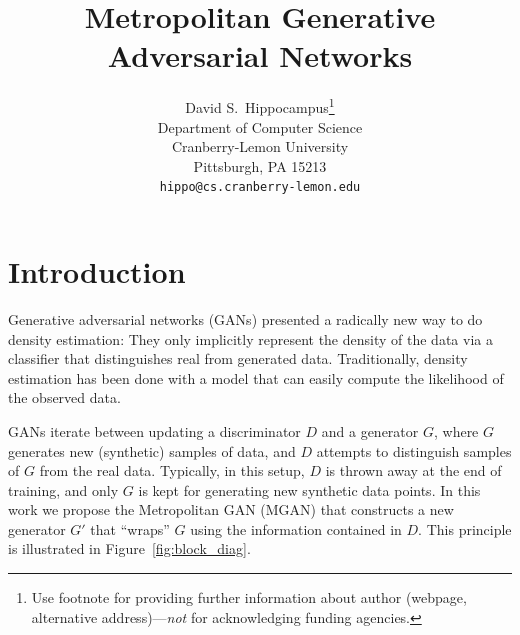 \documentclass{article}
\title{Metropolitan Generative Adversarial Networks}
\author{
  David S.~Hippocampus\thanks{Use footnote for providing further
    information about author (webpage, alternative
    address)---\emph{not} for acknowledging funding agencies.} \\
  Department of Computer Science\\
  Cranberry-Lemon University\\
  Pittsburgh, PA 15213 \\
  \texttt{hippo@cs.cranberry-lemon.edu} \\
}
\begin{document}

\maketitle


\section{Introduction}

Generative adversarial networks (GANs) presented a radically new way to do density estimation:
They only implicitly represent the density of the data via a classifier that distinguishes real from generated data.
Traditionally, density estimation has been done with a model that can easily compute the likelihood of the observed data.

GANs iterate between updating a discriminator $D$ and a generator $G$, where $G$ generates new (synthetic) samples of data, and $D$ attempts to distinguish samples of $G$ from the real data.
Typically, in this setup, $D$ is thrown away at the end of training, and only $G$ is kept for generating new synthetic data points.
In this work we propose the Metropolitan GAN (MGAN) that constructs a new generator $G'$ that ``wraps'' $G$ using the information contained in $D$.
This principle is illustrated in Figure~\ref{fig:block_diag}.
\end{document}
